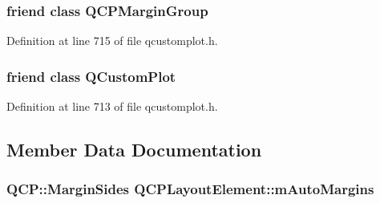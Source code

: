 \hypertarget{class_q_c_p_layout_element_ad077a686e85ab6fa03dcb2fd37fc499a}{}
\subsubsection[{Q\+C\+P\+Margin\+Group}]{\setlength{\rightskip}{0pt plus 5cm}friend class {\bf Q\+C\+P\+Margin\+Group}\hspace{0.3cm}{\ttfamily [friend]}}\label{class_q_c_p_layout_element_ad077a686e85ab6fa03dcb2fd37fc499a}


Definition at line 715 of file qcustomplot.\+h.

\hypertarget{class_q_c_p_layout_element_a1cdf9df76adcfae45261690aa0ca2198}{}
\subsubsection[{Q\+Custom\+Plot}]{\setlength{\rightskip}{0pt plus 5cm}friend class {\bf Q\+Custom\+Plot}\hspace{0.3cm}{\ttfamily [friend]}}\label{class_q_c_p_layout_element_a1cdf9df76adcfae45261690aa0ca2198}


Definition at line 713 of file qcustomplot.\+h.



\subsection{Member Data Documentation}
\hypertarget{class_q_c_p_layout_element_af61c70354d1275778d68206b2a1b2d36}{}
\subsubsection[{m\+Auto\+Margins}]{\setlength{\rightskip}{0pt plus 5cm}Q\+C\+P\+::\+Margin\+Sides Q\+C\+P\+Layout\+Element\+::m\+Auto\+Margins\hspace{0.3cm}{\ttfamily [protected]}}\label{class_q_c_p_layout_element_af61c70354d1275778d68206b2a1b2d36}


